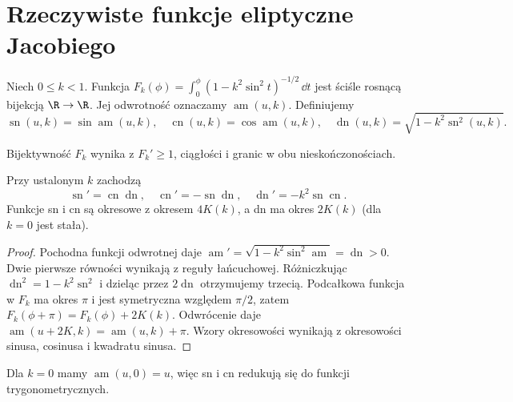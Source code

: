 \section{Rzeczywiste funkcje eliptyczne Jacobiego}
\begin{definicja}
\label{ma1:def:jacobi-real}
Niech $0\le k<1$. Funkcja
$F_k(\phi)=\int_0^\phi(1-k^2\sin^2t)^{-1/2}\,\dd t$
jest ściśle rosnącą bijekcją $\R\to\R$.
Jej odwrotność oznaczamy $\operatorname{am}(u,k)$.
Definiujemy
\[
 \operatorname{sn}(u,k)=\sin\operatorname{am}(u,k),\quad
 \operatorname{cn}(u,k)=\cos\operatorname{am}(u,k),\quad
 \operatorname{dn}(u,k)=\sqrt{1-k^2\operatorname{sn}^2(u,k)}.
\]
\end{definicja}
Bijektywność $F_k$ wynika z $F_k'\ge1$,
ciągłości i granic w obu nieskończonościach.
\begin{stwierdzenie}
\label{ma1:prop:jacobi-real}
Przy ustalonym $k$ zachodzą
\[
 \operatorname{sn}'=\operatorname{cn}\operatorname{dn},\quad
 \operatorname{cn}'=-\operatorname{sn}\operatorname{dn},\quad
 \operatorname{dn}'=-k^2\operatorname{sn}\operatorname{cn}.
\]
Funkcje sn i cn są okresowe z okresem $4K(k)$,
a dn ma okres $2K(k)$ (dla $k=0$ jest stała).
\end{stwierdzenie}
\begin{proof}
Pochodna funkcji odwrotnej daje
$\operatorname{am}'=\sqrt{1-k^2\sin^2\operatorname{am}}
=\operatorname{dn}>0$. Dwie pierwsze równości
wynikają z reguły łańcuchowej. Różniczkując
$\operatorname{dn}^2=1-k^2\operatorname{sn}^2$
i dzieląc przez $2\operatorname{dn}$ otrzymujemy
trzecią. Podcałkowa funkcja w $F_k$ ma okres $\pi$
i jest symetryczna względem $\pi/2$, zatem
$F_k(\phi+\pi)=F_k(\phi)+2K(k)$. Odwrócenie
daje $\operatorname{am}(u+2K,k)=\operatorname{am}(u,k)+\pi$.
Wzory okresowości wynikają z okresowości sinusa,
cosinusa i kwadratu sinusa.
\end{proof}
Dla $k=0$ mamy $\operatorname{am}(u,0)=u$, więc
sn i cn redukują się do funkcji trygonometrycznych.

